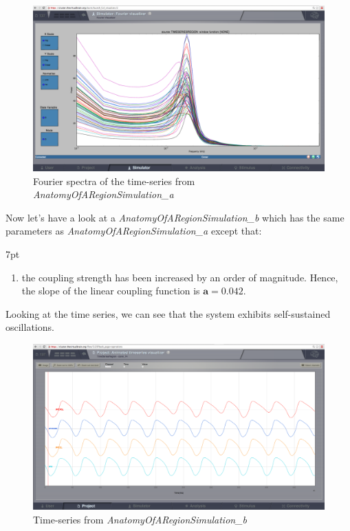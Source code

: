 \documentclass{tufte-handout}
\newenvironment{simulation}{%
  \def\FrameCommand{%
    \hspace{1pt}%
    {\color{ForestGreen}\vrule width 2pt}%
    {\color{simulationshade}\vrule width 4pt}%
    \colorbox{simulationshade}%
  }%
  \MakeFramed{\advance\hsize-\width\FrameRestore}%
  \noindent\hspace{-4.55pt}%
  \begin{adjustwidth}{}{7pt}%
  \vspace{2pt}\vspace{2pt}%
}
{%
  \vspace{2pt}\end{adjustwidth}\endMakeFramed%
}
\begin{document}
\begin{figure}[h]
  \includegraphics[width=\linewidth]{Handout_UI_BuildingYourOwnBrainNetworkModel_Fourier}%
  \caption{Fourier spectra of the time-series from \textit{AnatomyOfARegionSimulation\_a}}%
  \label{fig:fourier}%
\end{figure}

Now let's have a look at a \textit{AnatomyOfARegionSimulation\_b} which has the same parameters as \textit{AnatomyOfARegionSimulation\_a} except that:

\begin{simulation}
\begin{enumerate}
\item the coupling strength has been increased by an order of magnitude. Hence, the slope of the linear coupling function is  $\mathbf{a=0.042}$.
\end{enumerate}
\end{simulation}

Looking at the time series, we can see that the system exhibits self-sustained
oscillations. 

\begin{figure}[h]
  \includegraphics[width=\linewidth]{Handout_UI_BuildingYourOwnBrainNetworkModel_AnimatedTimeSeriesOscillatory}%
  \caption{Time-series from \textit{AnatomyOfARegionSimulation\_b}}%
  \label{fig:time_series_oscillatory}%
\end{figure}
\end{document}
